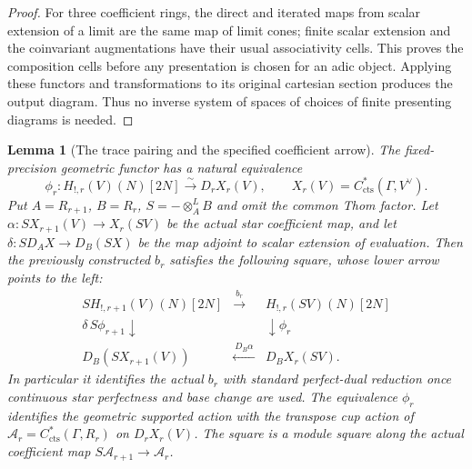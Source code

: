 \documentclass[11pt]{article}
\newtheorem{lemma}[theorem]{Lemma}
\theoremstyle{definition}
\theoremstyle{remark}
\begin{document}
\begin{proof}
For three coefficient rings, the direct and iterated maps from
scalar extension of a limit are the same map of limit cones;
finite scalar extension and the coinvariant augmentations have
their usual associativity cells.  This proves the composition cells
before any presentation is chosen for an adic object.  Applying
these functors and transformations to its original cartesian section
produces the output diagram.  Thus no inverse system of spaces of
choices of finite presenting diagrams is needed.
\end{proof}

\begin{lemma}[The trace pairing and the specified coefficient arrow]
\label{lem:frag-point-trace-diagram-descent}
The fixed-precision geometric functor has a natural equivalence
\[
 \phi_r:H_{!,r}(V)(N)[2N]\xrightarrow{\sim}
 D_rX_r(V),\qquad X_r(V)=C^*_{\mathrm{cts}}(\Gamma,V^\vee).
\]
Put $A=R_{r+1}$, $B=R_r$, $S=-\otimes_A^LB$ and omit the common
Thom factor.  Let
$\alpha:S X_{r+1}(V)\to X_r(SV)$ be the actual star coefficient map,
and let $\delta:S D_A X\to D_B(SX)$ be the map adjoint to scalar
extension of evaluation.  Then the previously constructed $b_r$
satisfies the following square, whose lower arrow points to the left:
\begin{equation}
\begin{array}{ccc}
 S H_{!,r+1}(V)(N)[2N]&\xrightarrow{\ b_r\ }&H_{!,r}(SV)(N)[2N]\\
 {\scriptstyle\delta\, S\phi_{r+1}}\downarrow&&
                    \downarrow{\scriptstyle\phi_r}\\
 D_B(SX_{r+1}(V))&\xleftarrow{\ D_B\alpha\ }&D_BX_r(SV).
\end{array}
\label{eq:frag-specified-trace-reduction-square}
\end{equation}
In particular it identifies the actual $b_r$ with standard perfect-dual
reduction once continuous star perfectness and base change are used.
The equivalence $\phi_r$ identifies the geometric supported action
with the transpose cup action of
$\mathcal A_r=C^*_{\mathrm{cts}}(\Gamma,R_r)$ on $D_rX_r(V)$.
The square is a module square along the actual coefficient map
$S\mathcal A_{r+1}\to\mathcal A_r$.
\end{lemma}
\end{document}
